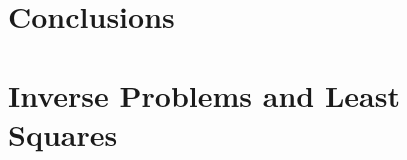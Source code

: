 \documentclass[12pt,MSc,twoside]{muthesis}
\numberwithin{equation}{section}
\begin{document}
\chapter{Conclusions}



\appendix
\chapter{Inverse Problems and Least Squares}




\end{document}
